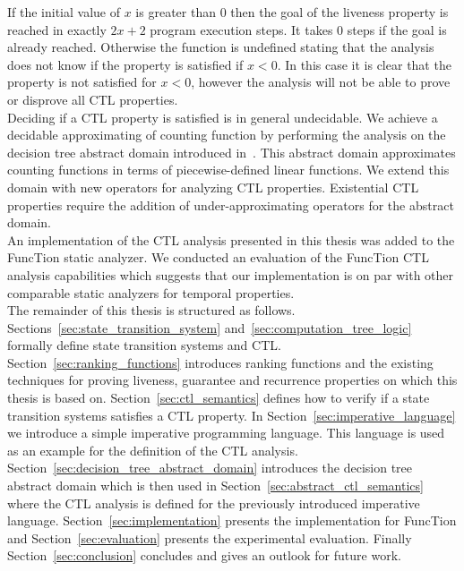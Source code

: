 \documentclass[11pt,a4paper,titlepage]{article}
\theoremstyle{definition}
\begin{document}
If the initial value of $x$ is greater than $0$ then the goal of the liveness property is reached in exactly $2x + 2$ program execution steps.
It takes $0$ steps if the goal is already reached. Otherwise the function is undefined stating that the analysis does not know if the property 
is satisfied if $x < 0$. In this case it is clear that the property is not satisfied for $x < 0$, however the analysis will not be able to 
prove or disprove all CTL properties.\\

Deciding if a CTL property is satisfied is in general undecidable. We achieve a decidable approximating of counting function by performing
the analysis on the decision tree abstract domain introduced in~\cite{UrbanPhd}. This abstract domain approximates counting functions in terms of 
piecewise-defined linear functions. We extend this domain with new operators for analyzing CTL properties. Existential CTL properties
require the addition of under-approximating operators for the abstract domain.\\

An implementation of the CTL analysis presented in this thesis was added to the FuncTion static analyzer. 
We conducted an evaluation of the FuncTion CTL analysis capabilities which suggests that our implementation is on par with other comparable static analyzers
for temporal properties.\\

The remainder of this thesis is structured as follows. 
Sections~\ref{sec:state_transition_system} and~\ref{sec:computation_tree_logic} formally define state transition systems and CTL.
Section~\ref{sec:ranking_functions} introduces ranking functions and the existing techniques for proving liveness, 
guarantee and recurrence properties on which this thesis is based on.
Section~\ref{sec:ctl_semantics} defines how to verify if a state transition systems satisfies a CTL property.
In Section~\ref{sec:imperative_language} we introduce a simple imperative programming language. 
This language is used as an example for the definition of the CTL analysis. 
Section~\ref{sec:decision_tree_abstract_domain} introduces the decision tree abstract domain which is then used 
in Section~\ref{sec:abstract_ctl_semantics} where the CTL analysis is defined for the previously introduced imperative language. 
Section~\ref{sec:implementation} presents the implementation for 
FuncTion and Section~\ref{sec:evaluation} presents the experimental evaluation. 
Finally Section~\ref{sec:conclusion} concludes and gives an outlook for future work.\\
\end{document}
